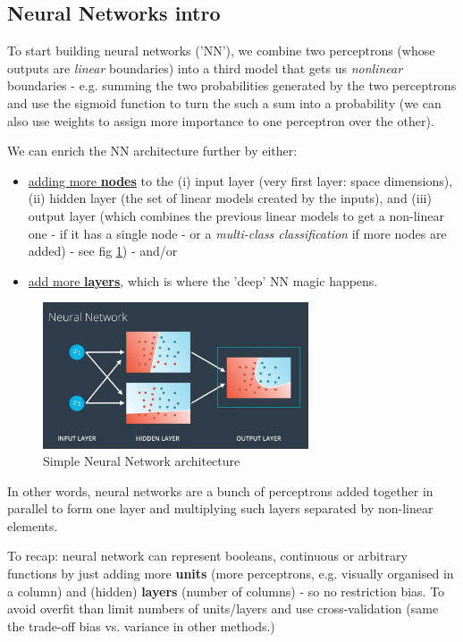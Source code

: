 \documentclass[11pt]{article}
\begin{document}
\subsection{Neural Networks intro}
To start building neural networks ('NN'), we combine two perceptrons (whose outputs are \textit{linear} boundaries) into a third model that gets us \textit{nonlinear} boundaries - e.g. summing the two probabilities generated by the two perceptrons and use the sigmoid function to turn the such a sum into a probability (we can also use weights to assign more importance to one perceptron over the other). 

We can enrich the NN architecture further by either:
\begin{itemize}
	\item \underline{adding more \textbf{nodes}} to the (i) input layer (very first layer: space dimensions), (ii) hidden layer (the set of linear models created by the inputs), and (iii) output layer (which combines the previous linear models to get a non-linear one - if it has a single node - or a \textit{multi-class classification} if more nodes are added) - see fig \ref{neural_network_simple}) - and/or
	\item \underline{add more \textbf{layers}}, which is where the 'deep' NN magic happens.
\end{itemize}
\begin{figure}[htbp] 
	\centering
	\includegraphics[width=0.7\textwidth]{pics/neural_network_simple}
	\caption{Simple Neural Network architecture} 
	\label{neural_network_simple}
\end{figure}
In other words, neural networks are a bunch of perceptrons added together in parallel to form one layer and multiplying such layers separated by non-linear elements.

To recap: neural network can represent booleans, continuous or arbitrary functions by just adding more \textbf{units} (more perceptrons, e.g. visually organised in a column) and (hidden) \textbf{layers} (number of columns) - so no restriction bias. To avoid overfit than limit numbers of units/layers and use cross-validation (same the trade-off bias vs. variance in other methods.)
\end{document}
